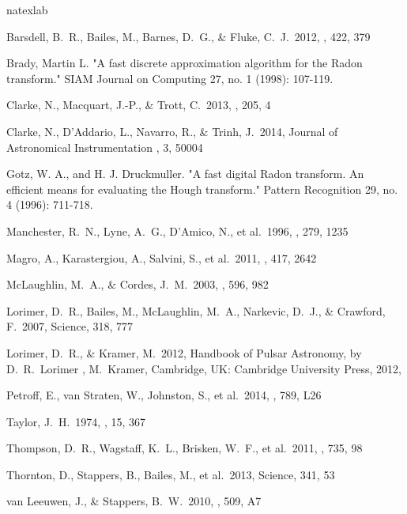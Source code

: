 \documentclass[iop]{emulateapj}
\begin{document}
\begin{thebibliography}{}
\expandafter\ifx\csname natexlab\endcsname\relax\def\natexlab#1{#1}\fi


 Barsdell, B.~R., Bailes, M., Barnes, D.~G., \& Fluke, C.~J.\ 2012, \mnras, 422, 379  

 Brady, Martin L. "A fast discrete approximation algorithm for the Radon transform." SIAM Journal on Computing 27, no. 1 (1998): 107-119.

 Clarke, N., Macquart, J.-P., \& Trott, C.\ 2013, \apjs, 205, 4 

 Clarke, N., D'Addario, L., Navarro, R., \& Trinh, J.\ 2014, Journal of Astronomical Instrumentation , 3, 50004 


	Gotz, W. A., and H. J. Druckmuller. "A fast digital Radon transform. An efficient means for evaluating the Hough transform." Pattern Recognition 29, no. 4 (1996): 711-718.


 Manchester, R.~N., 
Lyne, A.~G., D'Amico, N., et al.\ 1996, \mnras, 279, 1235


 Magro, A., Karastergiou, 
A., Salvini, S., et al.\ 2011, \mnras, 417, 2642


 McLaughlin, M.~A., \& Cordes, J.~M.\ 2003, \apj, 596, 982 

 Lorimer, D.~R., Bailes, 
M., McLaughlin, M.~A., Narkevic, D.~J., 
\& Crawford, F.\ 2007, Science, 318, 777

 Lorimer, D.~R., \& Kramer, M.\ 2012, Handbook of Pulsar Astronomy, by D.~R.~Lorimer , M.~Kramer, Cambridge, UK: Cambridge University Press, 2012,

 Petroff, E., van 
Straten, W., Johnston, S., et al.\ 2014, \apjl, 789, L26  

 Taylor, J.~H.\ 1974, \aaps, 15, 367 

 Thompson, D.~R., Wagstaff, K.~L., Brisken, W.~F., et al.\ 2011, \apj, 735, 98 

 Thornton, D., 
Stappers, B., Bailes, M., et al.\ 2013, Science, 341, 53

 van Leeuwen, J., \& Stappers, B.~W.\ 2010, \aap, 509, A7


\end{thebibliography}
\end{document}

